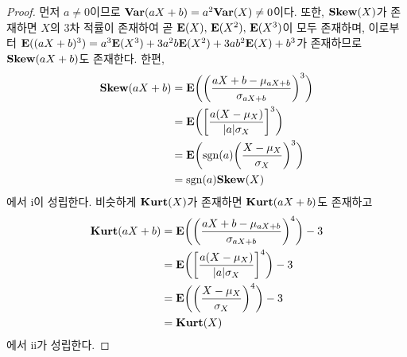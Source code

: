 \begin{proof}
    먼저 $a\ne0$이므로 $\mathbf{Var}(aX+b)=a^2\mathbf{Var}(X)\ne0$이다. 또한, $\mathbf{Skew}(X)$가 존재하면 $X$의 $3$차 적률이 존재하여 곧 $\mathbf{E}(X),\,\mathbf{E}(X^2),\,\mathbf{E}(X^3)$이 모두 존재하며, 이로부터 $\mathbf{E}((aX+b)^3)=a^3\mathbf{E}(X^3)+3a^2b\mathbf{E}(X^2)+3ab^2\mathbf{E}(X)+b^3$가 존재하므로 $\mathbf{Skew}(aX+b)$도 존재한다. 한편,
    \begin{align*}
        \mathbf{Skew}(aX+b)&=\mathbf{E}\bigg(\bigg(\frac{aX+b-\mu_{aX+b}}{\sigma_{aX+b}}\bigg)^3\bigg)\\
        &=\mathbf{E}\bigg(\bigg[\frac{a(X-\mu_X)}{|a|\sigma_X}\bigg]^3\bigg)\\
        &=\mathbf{E}\bigg(\mathrm{sgn}(a)\bigg(\frac{X-\mu_X}{\sigma_X}\bigg)^3\bigg)\\
        &=\mathrm{sgn}(a)\mathbf{Skew}(X)
    \end{align*}
    에서 i이 성립한다. 비슷하게 $\mathbf{Kurt}(X)$가 존재하면 $\mathbf{Kurt}(aX+b)$도 존재하고
    \begin{align*}
        \mathbf{Kurt}(aX+b)&=\mathbf{E}\bigg(\bigg(\frac{aX+b-\mu_{aX+b}}{\sigma_{aX+b}}\bigg)^4\bigg)-3\\
        &=\mathbf{E}\bigg(\bigg[\frac{a(X-\mu_X)}{|a|\sigma_X}\bigg]^4\bigg)-3\\
        &=\mathbf{E}\bigg(\bigg(\frac{X-\mu_X}{\sigma_X}\bigg)^4\bigg)-3\\
        &=\mathbf{Kurt}(X)
    \end{align*}
    에서 ii가 성립한다.
\end{proof}

